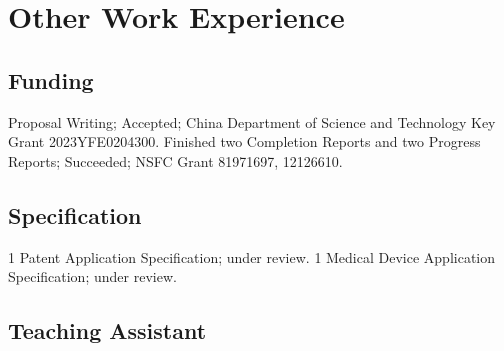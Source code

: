 \documentclass[11pt,a4paper, final]{moderncv}
\newcommand{\spacesection}{\vspace{0.4cm}}
\newcommand{\spacesubsection}{\vspace{0.2cm}}
\begin{document}
\section{\textbf{Other Work Experience}}
	\subsection{\textbf{Funding}}
		{Proposal Writing; Accepted; China Department of Science and Technology Key Grant 2023YFE0204300.}
		{Finished two Completion Reports and two Progress Reports; Succeeded; NSFC Grant 81971697, 12126610.}
	\subsection{\textbf{Specification}}
		{1 Patent Application Specification; under review.}
		{1 Medical Device Application Specification; under review.}
	\subsection{\textbf{Teaching Assistant}}
\end{document}
